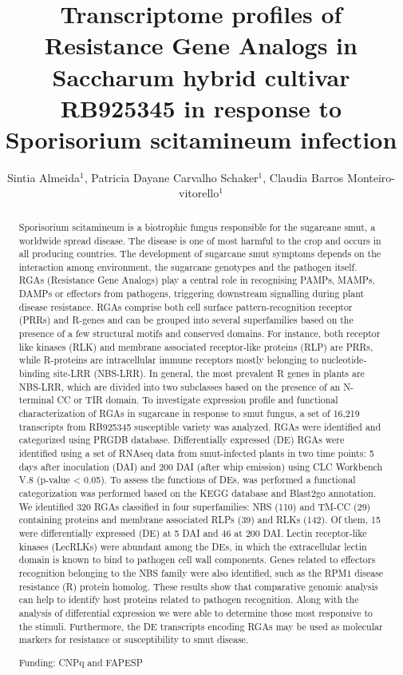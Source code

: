 \documentclass[twoside]{article}
\title{\vspace{-15mm}\fontsize{24pt}{10pt}\selectfont\textbf{Transcriptome profiles of Resistance Gene Analogs in Saccharum hybrid cultivar RB925345 in response to Sporisorium scitamineum infection}} %
\author{Sintia Almeida$^1$, Patricia Dayane Carvalho Schaker$^1$, Claudia Barros Monteiro-vitorello$^1$}
\affil{1 USP\\ }
\date{}
\begin{document}
\maketitle %

\thispagestyle{fancy} %


\begin{abstract}
Sporisorium scitamineum is a biotrophic fungus responsible for the sugarcane smut, a worldwide spread disease. The disease is one of most harmful to the crop and occurs in all producing countries. The development of sugarcane smut symptoms depends on the interaction among environment, the sugarcane genotypes and the pathogen itself. RGAs (Resistance Gene Analogs) play a central role in recognising PAMPs, MAMPs, DAMPs or effectors from pathogens, triggering downstream signalling during plant disease resistance. RGAs comprise both cell surface pattern-recognition receptor (PRRs) and R-genes and can be grouped into several superfamilies based on the presence of a few structural motifs and conserved domains. For instance, both receptor like kinases (RLK) and membrane associated receptor-like proteins (RLP) are PRRs, while R-proteins are intracellular immune receptors mostly belonging to nucleotide-binding site-LRR (NBS-LRR). In general, the most prevalent R genes in plants are NBS-LRR, which are divided into two subclasses based on the presence of an N-terminal CC or TIR domain. 
To investigate expression profile and functional characterization of RGAs in sugarcane in response to smut fungus, a set of 16,219 transcripts from RB925345 susceptible variety was analyzed. RGAs were identified and categorized using PRGDB database. Differentially expressed (DE) RGAs were identified using a set of RNAseq data from smut-infected plants in two time points: 5 days after inoculation (DAI) and 200 DAI (after whip emission) using CLC Workbench V.8 (p-value < 0.05). To assess the functions of DEs, was performed a functional categorization was performed based on the KEGG database and Blast2go annotation.
We identified 320 RGAs classified in four superfamilies: NBS (110) and TM-CC (29) containing proteins and membrane associated RLPs (39) and RLKs (142). Of them, 15 were differentially expressed (DE) at 5 DAI and 46 at 200 DAI. Lectin receptor-like kinases (LecRLKs) were abundant among the DEs, in which the extracellular lectin domain   is known to bind to pathogen cell wall components. Genes related to effectors recognition belonging to the NBS family were also identified, such as the RPM1 disease resistance (R) protein homolog. 
These results show that comparative genomic analysis can help to identify host proteins related to pathogen recognition. Along with the analysis of differential expression we were able to determine those most responsive to the stimuli. 
Furthermore, the DE transcripts encoding RGAs may be used as molecular markers for resistance or susceptibility to smut disease.

Funding: CNPq and FAPESP
\end{abstract}
\end{document}
